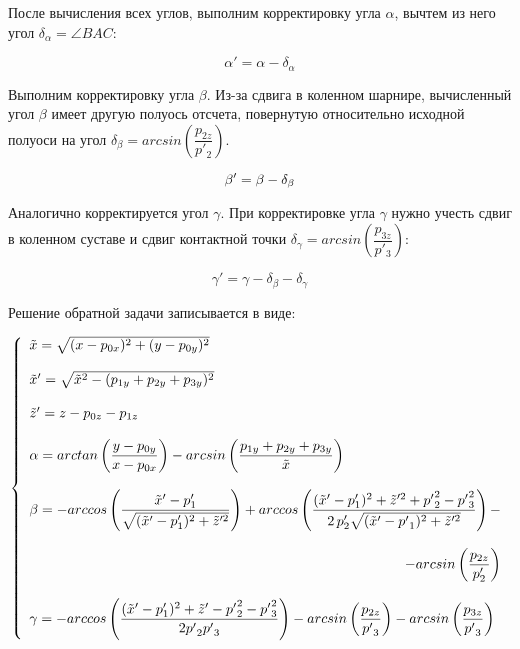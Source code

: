 После вычисления всех углов, выполним корректировку угла $\alpha$, вычтем из него угол $\delta_{\alpha} = \angle BAC$:

$$
\alpha' = \alpha - \delta_{\alpha}
$$

Выполним корректировку угла $\beta$. Из-за сдвига в коленном шарнире, вычисленный угол $\beta$ имеет другую полуось отсчета, повернутую относительно исходной полуоси на угол $\delta_{\beta} = arcsin\left(\dfrac{p_{2z}}{p'_2}\right)$.

$$
\beta' = \beta-\delta_{\beta}\\
$$

Аналогично корректируется угол $\gamma$. При корректировке  угла $\gamma$ нужно учесть сдвиг в коленном суставе и сдвиг контактной точки $\delta_{\gamma} = arcsin\left(\dfrac{p_{3z}}{p'_3}\right)$:

$$
\gamma' = \gamma - \delta_{\beta}-\delta_{\gamma}
$$

\newpage
Решение обратной задачи записывается в виде:
 
\begin{equation}
\left\{
\begin{array}{lcr}
\tilde{x} = \sqrt{(x-p_{0x})^2+(y-p_{0y})^2}\\
\\
\tilde{x}' = \sqrt{\tilde{x}^2-(p_{1y}+p_{2y}+p_{3y})^2}\\
\\
\tilde{z}' = z-p_{0z}-p_{1z}\\
\\
\alpha = arctan\left(\dfrac{y-p_{0y}}{x-p_{0x}}\right)-arcsin\left(\dfrac{p_{1y}+p_{2y}+p_{3y}}{\tilde{x}}\right)\\
\\
\beta = -arccos\left(\dfrac{\tilde{x}'-p_1'}{\sqrt{(\tilde{x}'-p_1')^2+\tilde{z}'^2}}\right)+arccos\left(\dfrac{(\tilde{x}'-p_1')^2+\tilde{z}'^2+{p'}_2^2-{p'}_3^2}{2\,p_2'\sqrt{(\tilde{x}'-{p'}_1)^2+\tilde{z}'^2}}\right)-\\
\\
\hfill -arcsin\left(\dfrac{p_{2z}}{p_2'}\right)\\
\\
\gamma = -arccos\left(\dfrac{(\tilde{x}'-p_1')^2+\tilde{z}'-{p'}_2^2-{p'}_3^2}{2{p'}_2{p'}_3}\right)-arcsin\left(\dfrac{p_{2z}}{{p'}_3}\right)-arcsin\left(\dfrac{p_{3z}}{{p'}_3}\right)\\
\end{array}
\right.
\end{equation}



